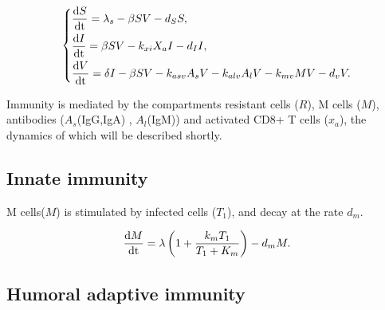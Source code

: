 \documentclass[preprint,11pt,sort&compress,square]{elsarticle}
\numberwithin{equation}{section}
\begin{document}
\begin{equation}\label{virusdynamics}
	\left\{
	\begin{aligned}
		 & \frac{{\rm d } S}{{\rm dt}}=\lambda_{s}-\beta S V-d_{S}S, \\
		 & \frac{{\rm d } I}{{\rm dt}}=\beta S V-k_{xi}X_{a}I-d_{I}I,                          \\
		 & \frac{{\rm d } V}{{\rm dt}}=\delta I-\beta SV-k_{asv}A_{s}V-k_{alv}A_{l}V-k_{mv}MV-d_{v}V.                          \\
	\end{aligned}
	\right.
\end{equation}



Immunity is mediated by the compartments resistant cells ($R$), M cells ($M$), antibodies ($A_{s}$(IgG,IgA) , $A_{l}$(IgM)) and activated CD8+ T cells ($x_{a}$), the dynamics of which will be described shortly.

\subsection{Innate immunity}



M cells($M$) is stimulated by infected cells ($T_{1}$), and decay at the rate $d_{m}$.

\begin{equation}\label{innateimmunity}
	\begin{aligned}
		 & \frac{{\rm d } M}{{\rm dt}}=\lambda\left(1+\frac{k_{m}T_{1}}{T_{1}+K_{m}}\right)-d_{m}M.   \\
	\end{aligned}
\end{equation}

\subsection{Humoral adaptive immunity}
\end{document}
